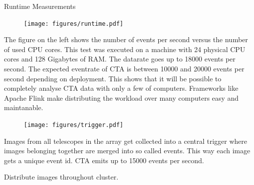 \begin{multicols}{2}
    \begin{block}[]{Runtime Measurements}%
      \begin{multicols}{2}
        \begin{figure}
          \texttt{[image: figures/runtime.pdf]}\\
        \end{figure}
        \columnbreak
          The figure on the left shows the number of events per second versus the number of used CPU cores.
          This test was executed on a machine with 24 physical CPU cores and 128 Gigabytes of RAM.
          The datarate goes up to \num{18000} events per second. The expected eventrate of CTA is between
          \num{10000} and \num{20000} events per second depending on deployment.
          This shows that it will be possible to completely analyse CTA data with only a few of computers.
          Frameworks like Apache Flink make distributing the workload over many computers easy and maintanable.
      \end{multicols}
    \end{block}%


    \columnbreak

        \begin{center}

        \begin{streamblock}[equal height group=C, width=0.8\linewidth]{0mm}{-5mm}{}%
          \begin{multicols}{2}
            \begin{figure}
              \texttt{[image: figures/trigger.pdf]}
            \end{figure}
            \columnbreak
            Images from all telescopes in the array get collected into a central trigger where images belonging together are merged into so called events.
            This way each image gets a unique event id.
            CTA emits up to \num{15 000} events per second\cite{trigger}.
          \end{multicols}
        \end{streamblock}%

        \begin{streamblock}[colframe=white!60!black, height=2.1cm, width=0.8\linewidth]{-5mm}{0mm}{}%
          \begin{center}
            Distribute images throughout cluster.
          \end{center}
        \end{streamblock}%


\end{center}
\end{multicols}
